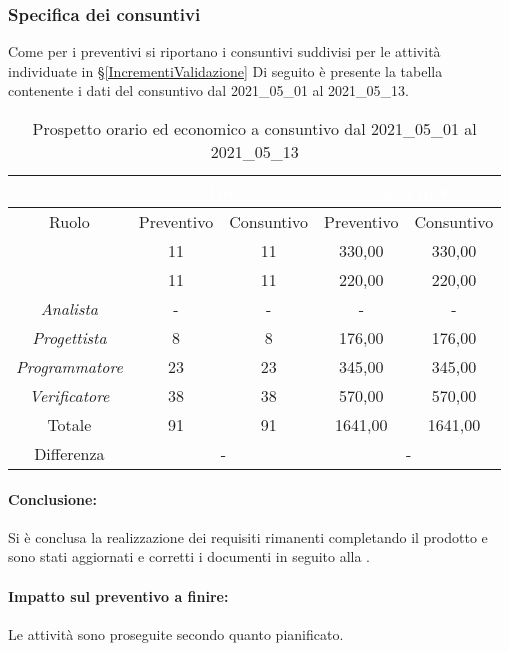 \subsubsection{Specifica dei consuntivi}
Come per i preventivi si riportano i consuntivi suddivisi per le attività individuate in \S\ref{IncrementiValidazione}
Di seguito è presente la tabella contenente i dati del consuntivo dal 2021\_05\_01 al 2021\_05\_13.
\begin{table}[H]
	\centering
	\begin{tabular}{|c|c|c|c|c|}
		\rowcolor{darkblue} 
		&\multicolumn{2}{c|}{\textcolor{white}{Ore}}&\multicolumn{2}{c|}{\textcolor{white}{Costo in €}}\\ \hline
		Ruolo				&	Preventivo			&	Consuntivo		&	Preventivo	&	Consuntivo\\ \hline
		{\Responsabile}		&	11					&	11				&	330,00		&	330,00 \\ \hline
		{\Amministratore}	&	11					&	11				&	220,00		&	220,00 \\ \hline
		\textit{Analista}	&	-					&	-				&	-			&	- \\ \hline
		\textit{Progettista}& 	8					&   8 				& 	176,00		&  	176,00 \\ \hline
		\textit{Programmatore}& 23					& 	23				& 	345,00		&  	345,00 \\ \hline
		\textit{Verificatore}&	38					&	38				&	570,00		&	570,00\\ \hline
		Totale				&	91					&	91				&	1641,00		&	1641,00 \\ \hline
		Differenza			& 	\multicolumn{2}{c|}{-} 			    &\multicolumn{2}{c|}{-}\\ \hline
	\end{tabular}
	\caption{Prospetto orario ed economico a consuntivo dal 2021\_05\_01 al 2021\_05\_13}
\end{table}
\paragraph*{Conclusione:}
Si è conclusa la realizzazione dei requisiti rimanenti completando il prodotto e sono stati aggiornati e corretti i documenti in seguito alla .
\paragraph*{Impatto sul preventivo a finire:}
Le attività sono proseguite secondo quanto pianificato.

